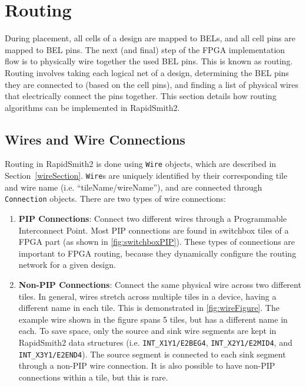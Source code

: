 \newpage
\section{Routing} \label{sec:routing}
\graphicspath{{./techReportFigures/sec7_routing/}}

During placement, all cells of a design are mapped to BELs, and all
cell pins are mapped to BEL pins. The next (and final) step of the
FPGA implementation flow is to physically wire together the used BEL pins. This
is known as routing. Routing involves taking each logical net of a design,
determining the BEL pins they are connected to (based on the cell pins), and
finding a list of physical wires that electrically connect the pins together.
This section details how routing algorithms can be implemented in RapidSmith2.

\subsection{Wires and Wire Connections} \label{wireConnSection}
Routing in RapidSmith2 is done using \texttt{Wire} objects, which are described
in Section~\ref{wireSection}. \texttt{Wire}s are uniquely identified by
their corresponding tile and wire name (i.e. ``tileName/wireName''), and are connected
through \texttt{Connec\-tion} objects. There are two types of wire connections:

\begin {enumerate}
  \item \textbf{PIP Connections}: Connect two different wires through a
  Programmable Interconnect Point. Most PIP connections are found in
  switchbox tiles of a FPGA part (as shown in \autoref{fig:switchboxPIP}).
  These types of connections are important to FPGA routing, because they
  dynamically configure the routing network for a given design.
   
  \item \textbf{Non-PIP Connections}: Connect the same physical wire across two
  different tiles. In general, wires stretch across multiple tiles in a device, having
  a different name in each tile. This is demonstrated in
  \autoref{fig:wireFigure}. The example wire shown in the figure spans 5
  tiles, but has a different name in each. To save space, only the
  source and sink wire segments are kept in RapidSmith2 data structures
  (i.e. \texttt{INT\_X1Y1/E2BEG4}, \texttt{INT\_X2Y1/E2MID4}, and
  \texttt{INT\_X3Y1/E2END4}). The source segment is connected to each sink
  segment through a non-PIP wire connection. It is also possible to have non-PIP
  connections within a tile, but this is rare.
\end{enumerate} 

